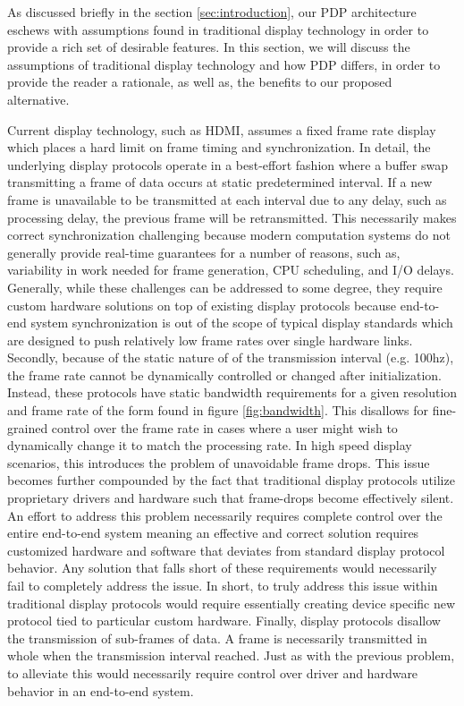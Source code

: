 \label{chap:problem_formulation}
As discussed briefly in the section \ref{sec:introduction}, our PDP architecture eschews with assumptions found in traditional display technology in order to provide a rich set of desirable features. In this section, we will discuss the assumptions of traditional display technology and how PDP differs, in order to provide the reader a rationale, as well as, the benefits to our proposed alternative.

Current display technology, such as HDMI, assumes a fixed frame rate display which places a hard limit on frame timing and synchronization. In detail, the underlying display protocols operate in a best-effort fashion where a buffer swap transmitting a frame of data occurs at static predetermined interval. If a new frame is unavailable to be transmitted at each interval due to any delay, such as processing delay, the previous frame will be retransmitted. This necessarily makes correct synchronization challenging because modern computation systems do not generally provide real-time guarantees for a number of reasons, such as, variability in work needed for frame generation, CPU scheduling, and I/O delays. Generally, while these challenges can be addressed to some degree, they require custom hardware solutions on top of existing display protocols because end-to-end system synchronization is out of the scope of typical display standards which are designed to push relatively low frame rates over single hardware links. Secondly, because of the static nature of of the transmission interval (e.g. 100hz), the frame rate cannot be dynamically controlled or changed after initialization. Instead, these protocols have static bandwidth requirements for a given resolution and frame rate of the form found in figure \ref{fig:bandwidth}. This disallows for fine-grained control over the frame rate in cases where a user might wish to dynamically change it to match the processing rate. In high speed display scenarios, this introduces the problem of unavoidable frame drops. This issue becomes further compounded by the fact that traditional display protocols utilize proprietary drivers and hardware such that frame-drops become effectively silent. An effort to address this problem necessarily requires complete control over the entire end-to-end system meaning an effective and correct solution requires customized hardware and software that deviates from standard display protocol behavior. Any solution that falls short of these requirements would necessarily fail to completely address the issue. In short, to truly address this issue within traditional display protocols would require essentially creating device specific new protocol tied to particular custom hardware. Finally, display protocols disallow the transmission of sub-frames of data. A frame is necessarily transmitted in whole when the transmission interval reached. Just as with the previous problem, to alleviate this would necessarily require control over driver and hardware behavior in an end-to-end system.

